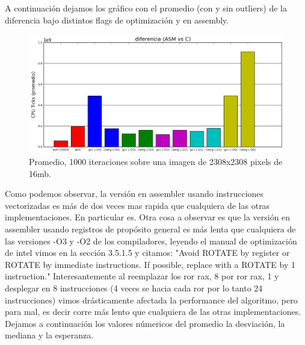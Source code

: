 \documentclass[a4paper]{article}
\begin{document}
 A continuación dejamos los gráfico con el promedio (con y sin outliers) de la diferencia bajo distintos flags de optimización y en assembly.
 \newpage
 
 
\begin{figure}[h]
\centerline{\includegraphics[scale=0.71]{imagenes/test_difrencia_ASM_C_PROMEDIO_Os}}
\caption{Promedio, 1000 iteraciones sobre una imagen de 2308x2308 pixels de 16mb.}
\end{figure}

Como podemos observar, la versión en assembler usando instrucciones vectorizadas es más de dos veces mas rapida que cualquiera de las otras implementaciones. En particular es. Otra cosa a observar es que la versión en assembler usando registros de propósito general es más lenta que cualquiera de las versiones -O3 y -O2 de los compiladores, leyendo el manual de optimización de intel vimos en la sección 3.5.1.5 y citamos: "Avoid ROTATE by register or ROTATE by immediate instructions. If possible, replace with a ROTATE by 1 instruction."
Interesantemente al reemplazar los ror rax, 8 por ror rax, 1 y desplegar en 8 instrucciones (4 veces se hacia cada ror por lo tanto 24 instrucciones) vimos drásticamente afectada la performance del algoritmo, pero para mal, es decir corre más lento que cualquiera de las otras implementaciones. Dejamos a continuación los valores númericos del promedio la desviación, la mediana y la esperanza.
\end{document}
